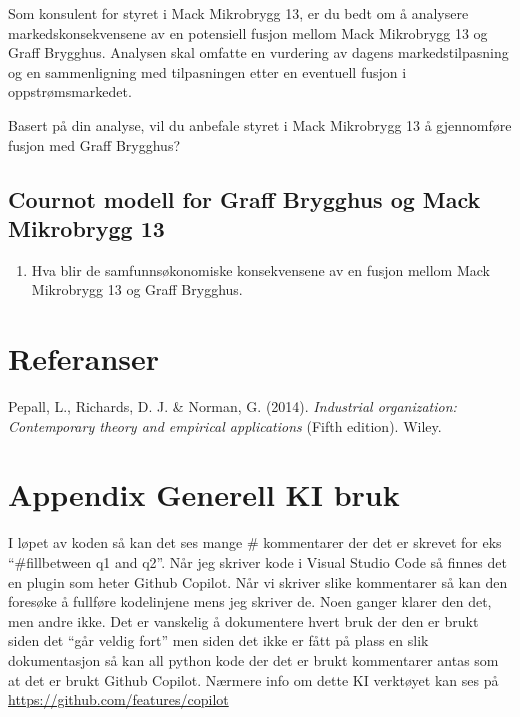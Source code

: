 \documentclass[
  12pt,
  a4paper,
  DIV=11,
  numbers=noendperiod]{scrartcl}
\providecommand{\tightlist}{%
  \setlength{\itemsep}{0pt}\setlength{\parskip}{0pt}}\usepackage{longtable,booktabs,array}
\newlength{\cslhangindent}
\newenvironment{CSLReferences}[2] %
 {\begin{list}{}{%
  \setlength{\itemindent}{0pt}
  \setlength{\leftmargin}{0pt}
  \setlength{\parsep}{0pt}
  \ifodd #1
   \setlength{\leftmargin}{\cslhangindent}
   \setlength{\itemindent}{-1\cslhangindent}
  \fi
  \setlength{\itemsep}{#2\baselineskip}}}
 {\end{list}}
\begin{document}
Som konsulent for styret i Mack Mikrobrygg 13, er du bedt om å analysere
markedskonsekvensene av en potensiell fusjon mellom Mack Mikrobrygg 13
og Graff Brygghus. Analysen skal omfatte en vurdering av dagens
markedstilpasning og en sammenligning med tilpasningen etter en
eventuell fusjon i oppstrømsmarkedet.

\clearpage

Basert på din analyse, vil du anbefale styret i Mack Mikrobrygg 13 å
gjennomføre fusjon med Graff Brygghus?

\subsection{Cournot modell for Graff Brygghus og Mack Mikrobrygg
13}\label{cournot-modell-for-graff-brygghus-og-mack-mikrobrygg-13}

\begin{enumerate}
\def\labelenumi{\alph{enumi})}
\setcounter{enumi}{2}
\tightlist
\item
  Hva blir de samfunnsøkonomiske konsekvensene av en fusjon mellom Mack
  Mikrobrygg 13 og Graff Brygghus.
\end{enumerate}

\clearpage

\section{Referanser}\label{referanser}

\label{refs}
\begin{CSLReferences}{1}{0}
Pepall, L., Richards, D. J. \& Norman, G. (2014). \emph{Industrial
organization: Contemporary theory and empirical applications} (Fifth
edition). Wiley.

\end{CSLReferences}

\clearpage

\appendix

\section {Appendix Generell KI bruk}

I løpet av koden så kan det ses mange \# kommentarer der det er skrevet
for eks ``\#fillbetween q1 and q2''. Når jeg skriver kode i Visual
Studio Code så finnes det en plugin som heter Github Copilot. Når vi
skriver slike kommentarer så kan den foresøke å fullføre kodelinjene
mens jeg skriver de. Noen ganger klarer den det, men andre ikke. Det er
vanskelig å dokumentere hvert bruk der den er brukt siden det ``går
veldig fort'' men siden det ikke er fått på plass en slik dokumentasjon
så kan all python kode der det er brukt kommentarer antas som at det er
brukt Github Copilot. Nærmere info om dette KI verktøyet kan ses på
\url{https://github.com/features/copilot}
\end{document}
